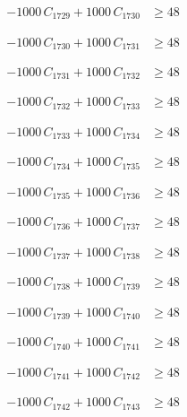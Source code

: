 \documentclass[a4paper,11pt]{article}
\begin{document}
\begin{align}
-1000\,C_{1729} + 1000\,C_{1730} &\geq 48 \nonumber
\end{align}

\begin{align}
-1000\,C_{1730} + 1000\,C_{1731} &\geq 48 \nonumber
\end{align}

\begin{align}
-1000\,C_{1731} + 1000\,C_{1732} &\geq 48 \nonumber
\end{align}

\begin{align}
-1000\,C_{1732} + 1000\,C_{1733} &\geq 48 \nonumber
\end{align}

\begin{align}
-1000\,C_{1733} + 1000\,C_{1734} &\geq 48 \nonumber
\end{align}

\begin{align}
-1000\,C_{1734} + 1000\,C_{1735} &\geq 48 \nonumber
\end{align}

\begin{align}
-1000\,C_{1735} + 1000\,C_{1736} &\geq 48 \nonumber
\end{align}

\begin{align}
-1000\,C_{1736} + 1000\,C_{1737} &\geq 48 \nonumber
\end{align}

\begin{align}
-1000\,C_{1737} + 1000\,C_{1738} &\geq 48 \nonumber
\end{align}

\begin{align}
-1000\,C_{1738} + 1000\,C_{1739} &\geq 48 \nonumber
\end{align}

\begin{align}
-1000\,C_{1739} + 1000\,C_{1740} &\geq 48 \nonumber
\end{align}

\begin{align}
-1000\,C_{1740} + 1000\,C_{1741} &\geq 48 \nonumber
\end{align}

\begin{align}
-1000\,C_{1741} + 1000\,C_{1742} &\geq 48 \nonumber
\end{align}

\begin{align}
-1000\,C_{1742} + 1000\,C_{1743} &\geq 48 \nonumber
\end{align}
\end{document}
